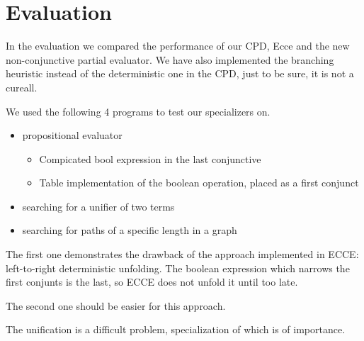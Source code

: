 \section{Evaluation}

In the evaluation we compared the performance of our CPD, Ecce and the new non-conjunctive partial evaluator.
We have also implemented the branching heuristic instead of the deterministic one in the CPD, just to be sure, it is not a cureall.

We used the following 4 programs to test our specializers on.
\begin{itemize}
  \item propositional evaluator
  \begin{itemize}
    \item Compicated bool expression in the last conjunctive
    \item Table implementation of the boolean operation, placed as a first conjunct
  \end{itemize}
  \item searching for a unifier of two terms
  \item searching for paths of a specific length in a graph
\end{itemize}

The first one demonstrates the drawback of the approach implemented in ECCE: left-to-right deterministic unfolding.
The boolean expression which narrows the first conjunts is the last, so ECCE does not unfold it until too late.

The second one should be easier for this approach.

The unification is a difficult problem, specialization of which is of importance.


